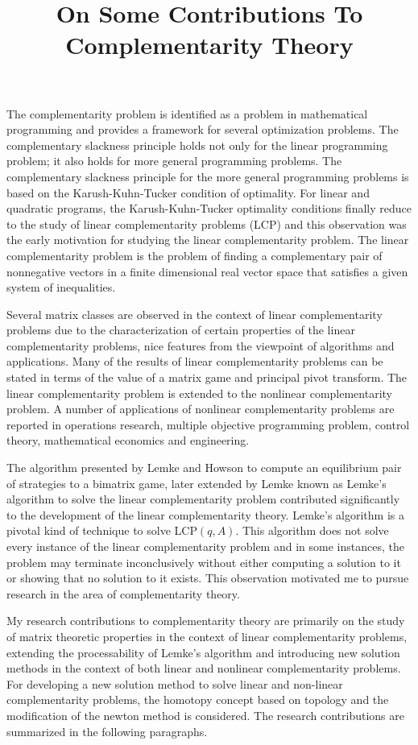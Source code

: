 \documentclass{article}
\title{On Some Contributions To Complementarity Theory}
\author{{Aritra Dutta}\\
{\and} \\
{\textit{email:}}\\{aritradutta001@gmail.com}\\
{\and}\\
{\textit{Affiliation:}}\\{ Department of Mathematics, Jadavpur University}\\
{\and}\\
{\textit{Supervisor:}} \\
{Dr. Arup Kumar Das} \\ {\and}\\{ SQC \& OR Unit, ISI Kolkata} }
\date{}
\begin{document}
\maketitle
The complementarity problem is identified as a problem in mathematical programming and provides a framework for several optimization problems. The complementary slackness principle holds not only for the linear programming problem; it also holds for  more general programming problems. The complementary slackness principle for the more general programming problems is based on the Karush-Kuhn-Tucker condition of optimality. For linear and quadratic programs, the Karush-Kuhn-Tucker optimality conditions finally reduce to the study of linear complementarity problems (LCP) and this observation was the early motivation for studying the linear complementarity problem. The linear complementarity problem is the problem of finding a complementary pair of nonnegative vectors in a finite dimensional real vector space that satisfies a given system of inequalities.

Several matrix classes are observed in the context of linear complementarity problems due to the characterization of certain properties of the linear complementarity problems, nice features from the viewpoint of algorithms and applications. Many of the results of linear complementarity problems can be stated in terms of the value of a matrix game and principal pivot transform. The linear complementarity problem is extended to the nonlinear complementarity problem. A number of applications of nonlinear complementarity problems are reported in operations research, multiple objective programming problem, control theory, mathematical economics and engineering.

The algorithm presented by Lemke and Howson to compute an equilibrium pair of strategies to a bimatrix game, later extended by Lemke known as Lemke’s algorithm to solve the linear complementarity problem contributed significantly to the development of the linear complementarity theory. Lemke’s algorithm is a pivotal kind of technique to solve LCP$(q, A)$. This algorithm does not solve every instance of the linear complementarity problem and in some instances, the problem may terminate inconclusively without either computing a solution
 to it or showing that no solution to it exists. This observation motivated me to pursue research in the area of complementarity theory.

My research contributions to complementarity theory are primarily on the study of matrix theoretic properties in the context of linear complementarity problems, extending the processability of Lemke’s algorithm and introducing new solution methods in the context of both linear and nonlinear complementarity problems. For developing a new solution method to solve linear and non-linear complementarity problems, the homotopy concept based on topology and the modification of the newton method is considered. The research contributions are summarized in the following paragraphs.
\end{document}
